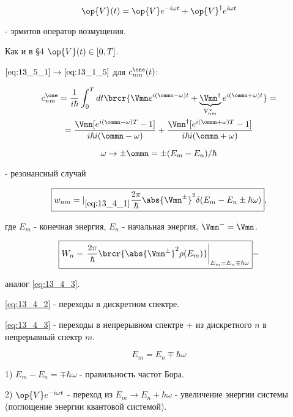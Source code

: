 \begin{equation}
\label{eq:13_5_1}
\op{V}(t) = \op{V}e^{-i\omega t} + \op{V}^\dag e^{i\omega t} 
\end{equation}

- эрмитов оператор возмущения.

Как и в \S 4 $\op{V}(t) \in [0, T]$.

$\eqref{eq:13_5_1} \to \eqref{eq:13_1_5}$ для $c_{nm}^\one (t)$:

\begin{gather*}
c_{nm}^\one = \frac{1}{i \hbar} \int_0^T dt \brcr{\Vmn e^{i(\ommn - \omega)t} + \underbrace{\Vmn^\dag}_{V_{nm}^*} e^{i(\ommn + \omega)t}} = \\
= \frac{\Vmn [e^{i(\ommn - \omega)T} - 1]}{i \hbar i (\ommn - \omega)} + \frac{\Vmn^\dag [e^{i(\ommn + \omega)T} - 1]}{i \hbar i (\ommn + \omega)}
\end{gather*}

$$
\omega \to \pm \ommn = \pm (E_m - E_n) / \hbar 
$$

- резонансный случай

\begin{equation}
\label{eq:13_5_2}
\boxed{w_{nm} =|_{\eqref{eq:13_4_1}} \frac{2\pi}{\hbar} \abs{\Vmn^\pm}^2 \delta(E_m - E_n \pm \hbar \omega)}, 
\end{equation}

где $E_m$ - конечная энергия, $E_n$ - начальная энергия, $\Vmn^- = \Vmn$.

\begin{equation}
\label{eq:13_5_3}
\boxed{W_n = \left .\frac{2\pi}{\hbar} \brcr{\abs{\Vmn^\pm}^2 \rho(E_m)} \right |_{E_m = E_n \mp \hbar \omega}} - 
\end{equation}

аналог \eqref{eq:13_4_3}.

\eqref{eq:13_4_2} - переходы в дискретном спектре.

\eqref{eq:13_4_3} - переходы в непрерывном спектре + из дискретного $n$ в непрерывный спектр $m$.

$$
E_m = E_n \mp \hbar \omega
$$

1) $E_m - E_n = \mp \hbar \omega$ - правильность частот Бора.

2) $\op{V} e^{-i \omega t}$ - переход из  $E_m \to E_n + \hbar \omega$ - увеличение энергии системы (поглощение энергии квантовой системой).
